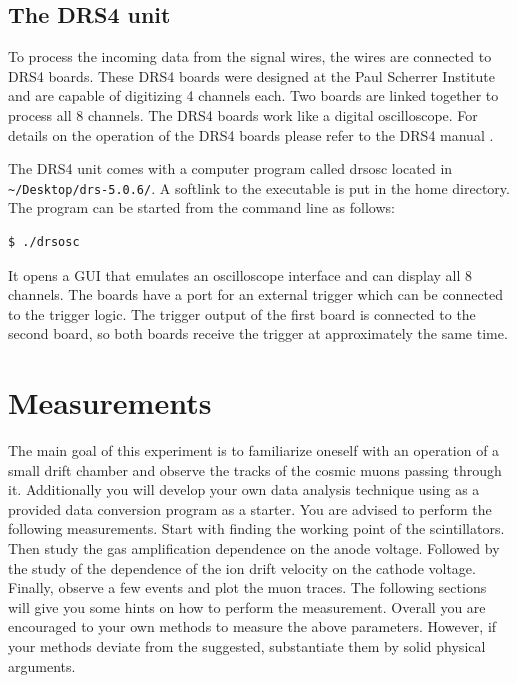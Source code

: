 \documentclass[12pt]{article}
\begin{document}


\subsection{The DRS4 unit}
To process the incoming data from the signal wires, the wires are connected to DRS4 boards. These DRS4 boards were designed at the Paul Scherrer Institute and are capable of digitizing 4 channels each. Two boards are linked together to process all 8 channels. The DRS4 boards work like a digital oscilloscope. For details on the operation of the DRS4 boards please refer to the DRS4 manual \cite{DRS4_manual}.

The DRS4 unit comes with a computer program called drsosc located in \verb|~/Desktop/drs-5.0.6/|. A softlink to the executable is put in the home directory. The program can be started from the command line as follows: 

\begin{lstlisting}[language=bash]
$ ./drsosc
\end{lstlisting}

 It opens a GUI that emulates an oscilloscope interface and can display all 8 channels. The boards have a port for an external trigger which can be connected to the trigger logic. The trigger output of the first board is connected to the second board, so both boards receive the trigger at approximately the same time.

\section{Measurements}
The main goal of this experiment is to familiarize oneself with an operation of a small drift chamber and observe the tracks of the cosmic muons passing through it. Additionally you will develop your own data analysis technique using as a provided data conversion program as a starter.  You are advised to  perform the following measurements. Start with finding the  working point of the scintillators. Then study the gas amplification dependence on the anode voltage. Followed by the study of the dependence of the ion drift velocity on the cathode voltage. Finally, observe a few events and plot the muon traces. The following sections will give you some hints on how to perform the measurement. Overall you are encouraged to your own methods to measure the above parameters. However, if your methods deviate from the suggested, substantiate them by solid physical arguments. 
\end{document}
